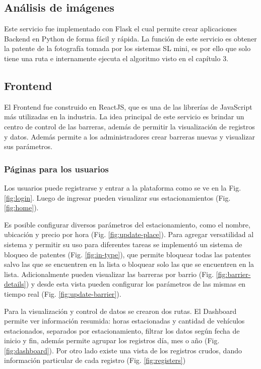 \subsection{Análisis de imágenes}

Este servicio fue implementado con Flask el cual permite crear aplicaciones Backend en Python de forma fácil y rápida. La función de este servicio es obtener la patente de la fotografía tomada por los sistemas SL mini, es por ello que solo tiene una ruta e internamente ejecuta el algoritmo visto en el capítulo 3.

\subsection{Frontend}

El Frontend fue construido en ReactJS, que es una de las librerías de JavaScript más utilizadas en la industria. La idea principal de este servicio es brindar un centro de control de las barreras, además de permitir la visualización de registros y datos. Además permite a los administradores crear barreras nuevas y visualizar sus parámetros.

\subsubsection*{Páginas para los usuarios}

Los usuarios puede registrarse y entrar a la plataforma como se ve en la Fig. \ref{fig:login}. Luego de ingresar pueden visualizar sus estacionamientos (Fig. \ref{fig:home}).

Es posible configurar diversos parámetros del estacionamiento, como el nombre, ubicación y precio por hora (Fig. \ref{fig:update-place}).
Para agregar versatilidad al sistema y permitir su uso para diferentes tareas se implementó un sistema de bloqueo de patentes (Fig. \ref{fig:in-type}), que permite bloquear todas las patentes salvo las que se encuentren en la lista o bloquear solo las que se encuentren en la lista. Adicionalmente pueden visualizar las barreras por barrio (Fig. \ref{fig:barrier-details}) y desde esta vista pueden configurar los parámetros de las mismas en tiempo real (Fig. \ref{fig:update-barrier}).

Para la visualización y control de datos se crearon dos rutas.
El Dashboard permite ver información resumida: horas estacionadas y cantidad de vehículos estacionados, separados por estacionamiento, filtrar los datos según fecha de inicio y fin, además permite agrupar los registros día, mes o año (Fig. \ref{fig:dashboard}).
Por otro lado existe una vista de los registros crudos, dando información particular de cada registro (Fig. \ref{fig:registers})


